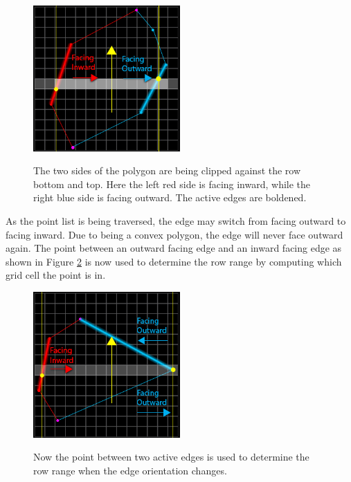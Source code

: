\documentclass[12pt]{ucthesis}
\newcommand{\captionfonts}{\small\bf\ssp}
\begin{document}
\begin{figure}
\begin{center}
\includegraphics[width=0.5\textwidth]{Images/RasterizingAlgorithm/Final/RasterizingInOut.png}
\captionfonts
\caption[Finding The Row Range]{The two sides of the polygon are being clipped against the row bottom and top.  Here the left red side is facing inward, while the right blue side is facing outward.  The active edges are boldened.}
\label{fig:finding-row-range}
\end{center}
\end{figure}

As the point list is being traversed, the edge may switch from facing outward to facing inward.
Due to being a convex polygon, the edge will never face outward again.
The point between an outward facing edge and an inward facing edge as shown in Figure \ref{fig:finding-row-range-switch} is now used to determine the row range by computing which grid cell the point is in.

\begin{figure}
\begin{center}
\includegraphics[width=0.5\textwidth]{Images/RasterizingAlgorithm/Final/RasterizingOuterInnerSwitch.png}
\captionfonts
\caption[Finding The Row Range In Orientation Switch]{Now the point between two active edges is used to determine the row range when the edge orientation changes.}
\label{fig:finding-row-range-switch}
\end{center}
\end{figure}


\clearpage


\end{document}

